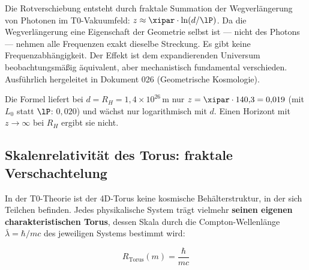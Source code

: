 \begin{keypoint}
Die Rotverschiebung entsteht durch fraktale Summation der Wegverlängerung von Photonen im T0-Vakuumfeld: $z \approx \xipar \cdot \ln(d/\lP)$. Da die Wegverlängerung eine Eigenschaft der Geometrie selbst ist — nicht des Photons — nehmen alle Frequenzen exakt dieselbe Streckung. Es gibt keine Frequenzabhängigkeit. Der Effekt ist dem expandierenden Universum beobachtungsmäßig äquivalent, aber mechanistisch fundamental verschieden. Ausführlich hergeleitet in Dokument 026 (Geometrische Kosmologie).

Die Formel liefert bei $d = R_H = 1{,}4\times 10^{26}$\,m nur $z = \xipar \cdot 140{,}3 = 0{,}019$ (mit $L_0$ statt $\lP$: $0{,}020$) und wächst nur logarithmisch mit $d$. Einen Horizont mit $z \to \infty$ bei $R_H$ ergibt sie nicht.
\end{keypoint}

\subsection{Skalenrelativität des Torus: fraktale Verschachtelung}

In der T0-Theorie ist der 4D-Torus keine kosmische Behälterstruktur, in der sich Teilchen befinden. Jedes physikalische System trägt vielmehr \textbf{seinen eigenen charakteristischen Torus}, dessen Skala durch die Compton-Wellenlänge $\bar\lambda = \hbar/mc$ des jeweiligen Systems bestimmt wird:

\begin{equation}
	R_{\text{Torus}}(m) = \frac{\hbar}{mc}
\end{equation}

\begin{table}[h]
\centering
{}
\caption{Systemspezifische Torus-Skalen — alle mit $L_0$ als gemeinsamer Untergrenze}
\end{table}

